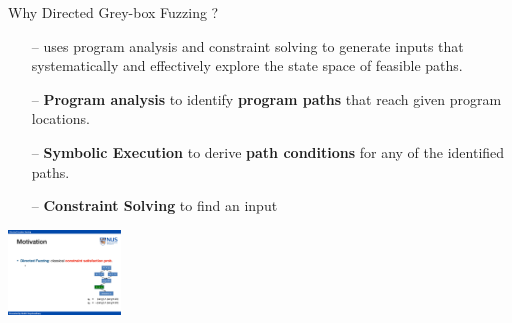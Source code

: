 \documentclass[10pt,aspectratio=43]{beamer}
\begin{document}
\begin{frame}{Why Directed Grey-box Fuzzing ?}
{\begin{itemize}
\begin{minipage}[t]{0.7\linewidth}
            \begin{itemize}
                \item[--]  uses program analysis and constraint solving to generate inputs that systematically 
                         and effectively explore the state space of feasible paths\cite{ma2011directed}.
                \item[--]  \alert{\textbf{Program analysis}} to identify \textcolor{deepblue}{\textbf{program paths}} that reach given program locations.
                \item[--]  \alert{\textbf{Symbolic Execution}} to derive \textcolor{deepblue}{\textbf{path conditions}} for any of the identified paths.
                \item[--] \alert{\textbf{Constraint Solving}} to find an input 
            \end{itemize}  
            \end{minipage}
            \begin{minipage}[t]{0.28\linewidth}
                \vspace{0pt}
                \centering 
                \includegraphics[width=3.0cm]{pic/dse.pdf} 
            \end{minipage} 
        \end{itemize} 
    }
\end{frame}
\end{document}
